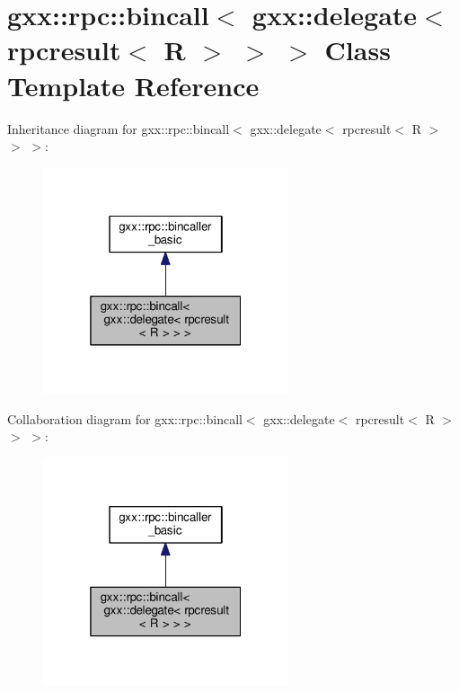 \hypertarget{classgxx_1_1rpc_1_1bincall_3_01gxx_1_1delegate_3_01rpcresult_3_01R_01_4_01_4_01_4}{}\section{gxx\+:\+:rpc\+:\+:bincall$<$ gxx\+:\+:delegate$<$ rpcresult$<$ R $>$ $>$ $>$ Class Template Reference}
\label{classgxx_1_1rpc_1_1bincall_3_01gxx_1_1delegate_3_01rpcresult_3_01R_01_4_01_4_01_4}


Inheritance diagram for gxx\+:\+:rpc\+:\+:bincall$<$ gxx\+:\+:delegate$<$ rpcresult$<$ R $>$ $>$ $>$\+:
\nopagebreak
\begin{figure}[H]
\begin{center}
\leavevmode
\includegraphics[width=205pt]{classgxx_1_1rpc_1_1bincall_3_01gxx_1_1delegate_3_01rpcresult_3_01R_01_4_01_4_01_4__inherit__graph}
\end{center}
\end{figure}


Collaboration diagram for gxx\+:\+:rpc\+:\+:bincall$<$ gxx\+:\+:delegate$<$ rpcresult$<$ R $>$ $>$ $>$\+:
\nopagebreak
\begin{figure}[H]
\begin{center}
\leavevmode
\includegraphics[width=205pt]{classgxx_1_1rpc_1_1bincall_3_01gxx_1_1delegate_3_01rpcresult_3_01R_01_4_01_4_01_4__coll__graph}
\end{center}
\end{figure}
